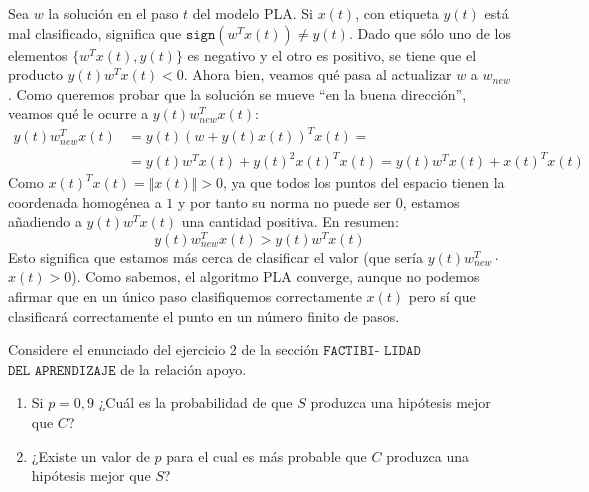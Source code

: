 \documentclass[11pt,leqno]{article}
\theoremstyle{definition}
\begin{document}
\begin{solucion}
Sea $w$ la solución en el paso $t$ del modelo PLA. Si $x(t)$, con etiqueta $y(t)$ está mal clasificado, significa que $\texttt{sign}(w^T x(t)) \neq y(t)$. Dado que sólo uno de los elementos $\{w^T x(t), y(t)\}$ es negativo y el otro es positivo, se tiene que el producto $y(t) w^T x(t) < 0$. Ahora bien, veamos qué pasa al actualizar $w$ a $w_{new}$. Como queremos probar que la solución se mueve ``en la buena dirección'', veamos qué le ocurre a $y(t) w_{new}^T x(t)$:
	\begin{equation}
	\begin{split}
	y(t) w_{new}^T x(t) &= y(t) (w + y(t)x(t))^T x(t) = \\
			&= y(t) w^T x(t) + y(t)^2 x(t)^T x(t) = y(t) w^T x(t) + x(t)^T x(t)
	\end{split}
	\end{equation}	 
	Como $x(t)^T x(t) = \Vert x(t) \Vert > 0$, ya que todos los puntos del espacio tienen la coordenada homogénea a $1$ y por tanto su norma no puede ser 0, estamos añadiendo a $y(t) w^T x(t)$ una cantidad positiva. En resumen:
	\[ y(t) w_{new}^T x(t) > y(t) w^T x(t) \]
	Esto significa que estamos más cerca de clasificar el valor (que sería $y(t) w_{new}^T \cdot$ $x(t)> 0$). Como sabemos, el algoritmo PLA converge, aunque no podemos afirmar que en un único paso clasifiquemos correctamente $x(t)$ pero sí que clasificará correctamente el punto en un número finito de pasos.
\end{solucion}

\begin{cuestion}
Considere el enunciado del ejercicio 2 de la sección $\texttt{FACTIBI-}$ $\texttt{LIDAD}$ $\texttt{DEL APRENDIZAJE}$
de la relación apoyo.

\begin{enumerate}[a]
\item Si $p = 0,9$ ¿Cuál es la probabilidad de que $S$ produzca una hipótesis mejor que $C$?

\item ¿Existe un valor de $p$ para el cual es más probable que $C$ produzca una hipótesis mejor que $S$?
\end{enumerate}
\end{cuestion}
\end{document}
